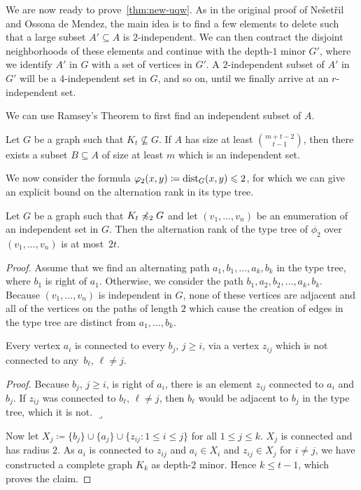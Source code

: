 We are now ready to prove~\cref{thm:new-uqw}. As in the 
original proof of Ne\v{s}et\v{r}il and Ossona de Mendez, the main 
idea is to find a few elements to delete such that a large
subset $A'\subseteq A$ is $2$-independent. We can then 
contract the disjoint neighborhoods of these elements and
continue with the depth-$1$ minor $G'$, where we 
identify $A'$ in $G$ with a set of vertices in $G'$. A $2$-independent
subset of $A'$ in $G'$ will be a $4$-independent set in $G$, 
and so on, until we finally arrive at an $r$-independent set. 

We can use Ramsey's Theorem to first find an independent subset
of $A$. 

\begin{lemma}\label{lem:ramsey1}
Let $G$ be a graph such that $K_t\not\subseteq G$. If $A$
has size at least $\binom{m+t-2}{t-1}$, then there exists
a subset $B\subseteq A$ of size at least $m$ which is an
independent set. 
\end{lemma}

We now consider the formula 
$\varphi_2(x,y)\coloneqq \mathrm{dist}_G(x,y)\leqslant 2$, for which we can give an explicit 
bound on the alternation rank in its type tree. 

\begin{lemma}\label{thm:alternation-rank-type-tree}
Let $G$ be a graph such that $K_t\not\preccurlyeq_2G$ and let
$(v_1,\ldots, v_n)$ be an enumeration of an independent set 
in $G$. Then the alternation rank of the type tree of $\phi_2$ 
over $(v_1,\ldots, v_n)$ is at most~$2t$. 
\end{lemma}
\begin{proof}
Assume that we find an alternating path $a_1,b_1,\ldots, a_k,b_k$ 
in the type tree, where $b_1$ is right of $a_1$. Otherwise, we consider
the path $b_1,a_2,b_2,\ldots,a_k, b_k$. Because $(v_1,\ldots, v_n)$ is independent in $G$, 
none of these vertices are adjacent and all of the vertices on the
paths of length $2$ which cause the creation of edges in the type
tree are distinct from $a_1,\ldots, b_k$. 

\begin{claim}
Every vertex $a_i$ is connected to every $b_j$, $j\geq i$,
via a vertex $z_{ij}$ which is not connected to any~$b_\ell$, $\ell\neq j$. 
\end{claim}

\noindent\textit{Proof.} Because $b_j$, $j\geq i$, is right of $a_i$, there is 
an element $z_{ij}$ connected to $a_i$ and $b_j$. If $z_{ij}$ was 
connected to $b_\ell$, $\ell\neq j$, then $b_\ell$ would be adjacent 
to $b_j$ in the type tree, which it is not. \hfill$\lrcorner$

\bigskip
Now let $X_j\coloneqq \{b_j\}\cup\{a_j\}\cup\{z_{ij} : 1\leq i\leq j\}$
for all $1\leq j\leq k$. $X_j$ is connected and has radius $2$. As $a_i$
is connected to $z_{ij}$ and $a_i\in X_i$ and $z_{ij}\in X_j$ for $i\neq j$, 
we have constructed a complete graph $K_k$ as depth-$2$ minor. Hence 
$k\leq t-1$, which proves the claim. 
\end{proof}

